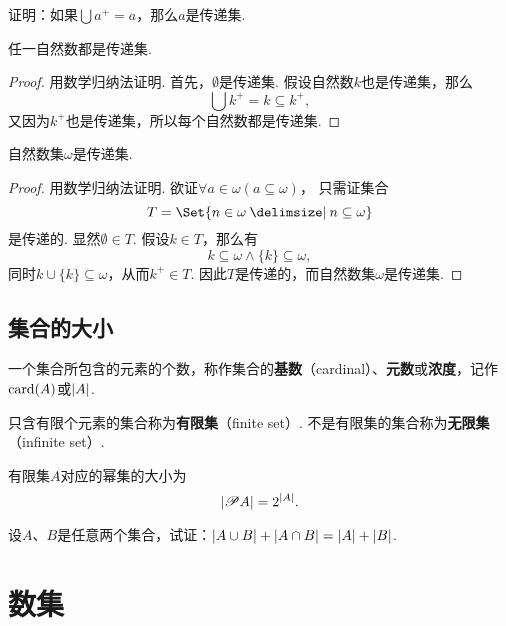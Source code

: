 \begin{example}
证明：如果\(\bigcup a^+ = a\)，那么\(a\)是传递集.
\end{example}

\begin{theorem}
任一自然数都是传递集.
\begin{proof}
用数学归纳法证明.
首先，\(\emptyset\)是传递集.
假设自然数\(k\)也是传递集，那么\[
\bigcup k^+ = k \subseteq k^+,
\]又因为\(k^+\)也是传递集，所以每个自然数都是传递集.
\end{proof}
\end{theorem}

\begin{theorem}
自然数集\(\omega\)是传递集.
\begin{proof}
用数学归纳法证明.
欲证\(\forall a \in \omega ( a \subseteq \omega )\)，%
只需证集合\[
T = \Set{n \in \omega \given n \subseteq \omega}
\]是传递的.
显然\(\emptyset \in T\).
假设\(k \in T\)，那么有\[
k \subseteq \omega
\land
\{k\} \subseteq \omega,
\]同时\(k \cup \{k\} \subseteq \omega\)，从而\(k^+ \in T\).
因此\(T\)是传递的，而自然数集\(\omega\)是传递集.
\end{proof}
\end{theorem}


\subsection{集合的大小}
\begin{definition}
一个集合所包含的元素的个数，称作集合的\textbf{基数}（cardinal）、\textbf{元数}或\textbf{浓度}，记作\(\operatorname{card}(A)\)或\(\abs{A}\).
\end{definition}

\begin{definition}
只含有限个元素的集合称为\textbf{有限集}（finite set）.
不是有限集的集合称为\textbf{无限集}（infinite set）.
\end{definition}

\begin{property}
有限集\(A\)对应的幂集的大小为\[
\abs{\mathscr{P} A} = 2^{\abs{A}}.
\]
\end{property}

\begin{example}
设\(A\)、\(B\)是任意两个集合，试证：\(\abs{A \cup B} + \abs{A \cap B} = \abs{A} + \abs{B}\).
\end{example}

\section{数集}
